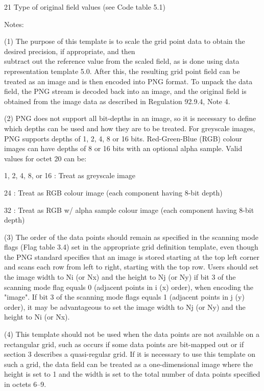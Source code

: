 21 Type of original field values (see Code table 5.1)

Notes:

(1) The purpose of this template is to scale the grid point data to obtain the desired precision, if appropriate, and then\\
subtract out the reference value from the scaled field, as is done using data representation template 5.0. After this, the resulting grid point field can be treated as an image and is then encoded into PNG format. To unpack the data field, the PNG stream is decoded back into an image, and the original field is obtained from the image data as described in Regulation 92.9.4, Note 4.

(2) PNG does not support all bit-depths in an image, so it is necessary to define which depths can be used and how they are to be treated. For greyscale images, PNG supports depths of 1, 2, 4, 8 or 16 bits. Red-Green-Blue (RGB) colour images can have depths of 8 or 16 bits with an optional alpha sample. Valid values for octet 20 can be:

1, 2, 4, 8, or 16 : Treat as greyscale image

24 : Treat as RGB colour image (each component having 8-bit depth)

32 : Treat as RGB w/ alpha sample colour image (each component having 8-bit depth)

(3) The order of the data points should remain as specified in the scanning mode flags (Flag table 3.4) set in the appropriate grid definition template, even though the PNG standard specifies that an image is stored starting at the top left corner and scans each row from left to right, starting with the top row. Users should set the image width to Ni (or Nx) and the height to Nj (or Ny) if bit 3 of the scanning mode flag equals 0 (adjacent points in i (x) order), when encoding the "image". If bit 3 of the scanning mode flags equals 1 (adjacent points in j (y) order), it may be advantageous to set the image width to Nj (or Ny) and the height to Ni (or Nx).

(4) This template should not be used when the data points are not available on a rectangular grid, such as occurs if some data points are bit-mapped out or if section 3 describes a quasi-regular grid. If it is necessary to use this template on such a grid, the data field can be treated as a one-dimensional image where the height is set to 1 and the width is set to the total number of data points specified in octets 6--9.


